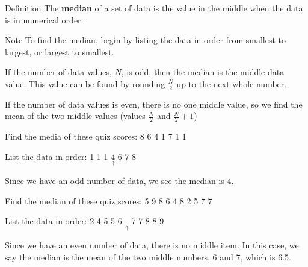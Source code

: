 \documentclass{beamer}
\begin{document}
\begin{frame}
\begin{example}
\begin{center}
\begin{tabular}{|c|c||c|c|}
abular}
\end{center}
What is the mean of this data?\pause
\begin{equation*}
\begin{aligned}
&\dfrac{\overbrace{15+\cdots+15}^{\text{6 terms}}+\overbrace{20+\cdots+20}^{\text{8 terms}}+\overbrace{25+\cdots+25}^{\text{11 terms}}+\cdots+\overbrace{50+\cdots+25}^{\text{7 terms}}}{100} \\
=&\dfrac{15\cdot 6+20\cdot 8+25\cdot 11+30\cdot 17+35\cdot 19+40\cdot 20+45\cdot 12+50\cdot 7}{100} \\
=& \dfrac{3390}{100} = 33.9
\end{aligned}
\end{equation*}
\end{example}
\end{frame}

\begin{frame}
\begin{block}{Definition}
The \textbf{median} of a set of data is the value in the middle when the data is in numerical order.
\end{block}\pause

\begin{block}{Note}
To find the median, begin by listing the data in order from smallest to largest, or largest to smallest.

\vspace{2mm}
If the number of data values, $N$, is odd, then the median is the middle data value. This value can be found by rounding $\frac{N}{2}$ up to the next whole number.

\vspace{2mm}
If the number of data values is even, there is no one middle value, so we find the mean
of the two middle values (values $\frac{N}{2}$ and $\frac{N}{2} + 1$)
\end{block}
\end{frame}

\begin{frame}
\begin{example}
Find the media of these quiz scores: 8 6 4 1 7 1 1\pause

\vspace{2mm}
List the data in order: 1 1 1 $\underset{\Uparrow}{4}$ 6 7 8

\vspace{2mm}
Since we have an odd number of data, we see the median is 4.
\end{example}\pause

\begin{example}
Find the median of these quiz scores: 5 9 8 6 4 8 2 5 7 7\pause

\vspace{2mm}
List the data in order: 2 4 5 5 6 $\underset{\Uparrow}{}$ 7 7 8 8 9

\vspace{2mm}
Since we have an even number of data, there is no middle item. In this case, we say the median is the mean of the two middle numbers, 6 and 7, which is 6.5.
\end{example}
\end{frame}
\end{document}
